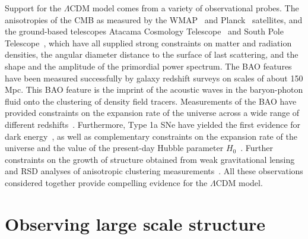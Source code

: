 Support for the $\Lambda$CDM model comes from a variety of observational probes. The anisotropies of the CMB as measured by the WMAP~\cite{Bennett:2013} and Planck~\cite{Aghanim:2018eyx} satellites, and the ground-based telescopes Atacama Cosmology Telescope~\cite{Das:2013zf} and South Pole Telescope~\cite{George:2014oba}, which have all supplied strong constraints on matter and radiation densities, the angular diameter distance to the surface of last scattering, and the shape and the amplitude of the primordial power spectrum. The BAO features have been measured successfully by galaxy redshift surveys on scales of about 150 Mpc. This BAO feature is the imprint of the acoustic waves in the baryon-photon fluid onto the clustering of density field tracers. Measurements of the BAO have provided constraints on the expansion rate of the universe across a wide range of different redshifts~\cite{BOSS:2016wmc,Ross:2014qpa,Oka:2013cba,Sanchez:2006,Beutler:2011,Kazin:2014qga}. Furthermore, Type 1a SNe have yielded the first evidence for dark energy~\cite{SupernovaSearchTeam:1998fmf,SupernovaCosmologyProject:1998vns}, as well as complementary constraints on the expansion rate of the universe and the value of the present-day Hubble parameter $H_0$~\cite{Freedman:2012,Riess:2016jrr,Suzuki:2012,SDSS:2014iwm}. Further constraints on the growth of structure obtained from weak gravitational lensing~\cite{DES:2017qwj,Heymans:2013fya} and RSD analyses of anisotropic clustering measurements~\cite{BOSS:2016psr,BOSS:2016teh}. All these observations considered together provide compelling evidence for the $\Lambda$CDM model.

\section{Observing large scale structure}


